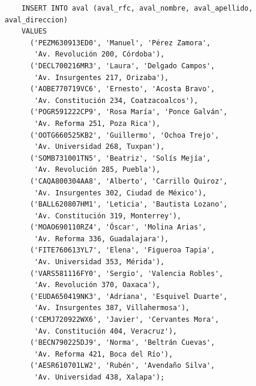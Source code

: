 \begin{verbatim}
	INSERT INTO aval (aval_rfc, aval_nombre, aval_apellido, aval_direccion)
	VALUES
	  ('PEZM630913ED0', 'Manuel', 'Pérez Zamora',
	   'Av. Revolución 200, Córdoba'),
	  ('DECL700216MR3', 'Laura', 'Delgado Campos',
	   'Av. Insurgentes 217, Orizaba'),
	  ('AOBE770719VC6', 'Ernesto', 'Acosta Bravo',
	   'Av. Constitución 234, Coatzacoalcos'),
	  ('POGR591222CP9', 'Rosa María', 'Ponce Galván',
	   'Av. Reforma 251, Poza Rica'),
	  ('OOTG660525KB2', 'Guillermo', 'Ochoa Trejo',
	   'Av. Universidad 268, Tuxpan'),
	  ('SOMB731001TN5', 'Beatriz', 'Solís Mejía',
	   'Av. Revolución 285, Puebla'),
	  ('CAQA800304AA8', 'Alberto', 'Carrillo Quiroz',
	   'Av. Insurgentes 302, Ciudad de México'),
	  ('BALL620807HM1', 'Leticia', 'Bautista Lozano',
	   'Av. Constitución 319, Monterrey'),
	  ('MOAO690110RZ4', 'Óscar', 'Molina Arias',
	   'Av. Reforma 336, Guadalajara'),
	  ('FITE760613YL7', 'Elena', 'Figueroa Tapia',
	   'Av. Universidad 353, Mérida'),
	  ('VARS581116FY0', 'Sergio', 'Valencia Robles',
	   'Av. Revolución 370, Oaxaca'),
	  ('EUDA650419NK3', 'Adriana', 'Esquivel Duarte',
	   'Av. Insurgentes 387, Villahermosa'),
	  ('CEMJ720922WX6', 'Javier', 'Cervantes Mora',
	   'Av. Constitución 404, Veracruz'),
	  ('BECN790225DJ9', 'Norma', 'Beltrán Cuevas',
	   'Av. Reforma 421, Boca del Río'),
	  ('AESR610701LW2', 'Rubén', 'Avendaño Silva',
	   'Av. Universidad 438, Xalapa');


\end{verbatim}
